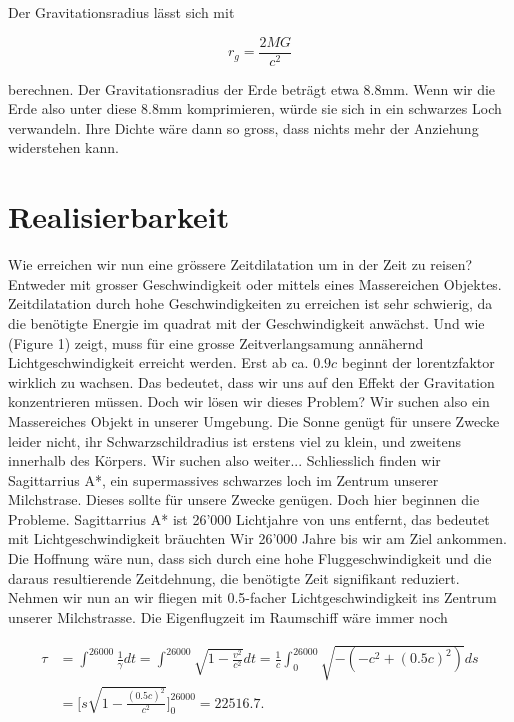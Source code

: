 \begin{refsection}
	Der Gravitationsradius lässt sich mit 

	\begin{equation}
		r_{g}= \frac{2MG}{c^2}
	\end{equation}

	berechnen.
	Der Gravitationsradius der Erde beträgt etwa 8.8mm. Wenn wir die Erde also unter  diese 8.8mm komprimieren, würde sie sich in ein schwarzes Loch verwandeln. Ihre Dichte wäre dann so gross, dass nichts mehr der Anziehung widerstehen kann.
	
	\section{Realisierbarkeit}
	
	Wie erreichen wir nun eine grössere Zeitdilatation um in der Zeit zu reisen? Entweder mit grosser Geschwindigkeit oder mittels eines Massereichen Objektes. Zeitdilatation durch hohe Geschwindigkeiten zu erreichen ist sehr schwierig, da die benötigte Energie im quadrat mit der Geschwindigkeit anwächst. Und wie (Figure 1) zeigt, muss für eine grosse Zeitverlangsamung annähernd Lichtgeschwindigkeit erreicht werden. Erst ab ca. $0.9c$ beginnt der lorentzfaktor wirklich zu wachsen.
	Das bedeutet, dass wir uns auf den Effekt der Gravitation  konzentrieren müssen.
	Doch wir lösen wir dieses Problem? Wir suchen also ein Massereiches Objekt in unserer Umgebung. Die Sonne genügt für unsere Zwecke leider nicht, ihr Schwarzschildradius ist erstens viel zu klein, und zweitens innerhalb des Körpers. Wir suchen also weiter... Schliesslich finden wir Sagittarrius A*, ein supermassives schwarzes loch im Zentrum unserer Milchstrase. Dieses sollte für unsere Zwecke genügen. 
	Doch hier beginnen die Probleme. 
	Sagittarrius A* ist 26'000 Lichtjahre von uns entfernt, das bedeutet mit Lichtgeschwindigkeit bräuchten Wir 26'000 Jahre bis wir am Ziel ankommen. Die Hoffnung wäre nun, dass sich durch eine hohe Fluggeschwindigkeit und die daraus resultierende Zeitdehnung, die benötigte Zeit signifikant reduziert. 
	Nehmen wir nun an wir fliegen mit 0.5-facher Lichtgeschwindigkeit ins Zentrum unserer Milchstrasse. Die Eigenflugzeit im Raumschiff wäre immer noch
	
	\begin{align*}
	\tau
	&= 
	\int_{}^{26000}\frac{1}{\gamma}dt=\int_{}^{26000}\sqrt{1-\frac{v^2}{c^2}}dt
	= 
	\frac{1}{c}\int_{0}^{26000}\sqrt{-(-c^2+(0.5c)^2)}ds\\
	&=
	\biggl[s\sqrt{1-\frac{(0.5c)^{2}}{c^2}}\biggr]_0^{26000}
	=
	22516.7.
	\end{align*}
	

\end{refsection}
